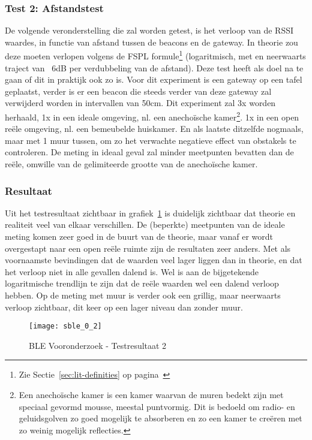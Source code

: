 \subsubsection{Test 2: Afstandstest}
\label{sec:ond-ble-0-2}
De volgende veronderstelling die zal worden getest, is het verloop van de RSSI waardes, in functie van afstand tussen de beacons en de gateway. In theorie zou deze moeten verlopen volgens de FSPL formule\footnote{Zie Sectie~\ref{sec:lit-definities} op pagina~\pageref{sec:lit-definities}} (logaritmisch, met en neerwaarts traject van ~6dB per verdubbeling van de afstand). Deze test heeft als doel na te gaan of dit in praktijk ook zo is.
Voor dit experiment is een gateway op een tafel geplaatst, verder is er een beacon die steeds verder van deze gateway zal verwijderd worden in intervallen van 50cm. Dit experiment zal 3x worden herhaald, 1x in een ideale omgeving, nl. een anechoïsche kamer\footnote{Een anechoïsche kamer is een kamer waarvan de muren bedekt zijn met speciaal gevormd mousse, meestal puntvormig. Dit is bedoeld om radio- en geluidsgolven zo goed mogelijk te absorberen en zo een kamer te creëren met zo weinig mogelijk reflecties.}. 1x in een open reële omgeving, nl. een bemeubelde huiskamer. En als laatste ditzelfde nogmaals, maar met 1 muur tussen, om zo het verwachte negatieve effect van obstakels te controleren. De meting in ideaal geval zal minder meetpunten bevatten dan de reële, omwille van de gelimiteerde grootte van de anechoïsche kamer.

\subsubsection{Resultaat}
Uit het testresultaat zichtbaar in grafiek~\ref{fig:ond-ble-2-res} is duidelijk zichtbaar dat theorie en realiteit veel van elkaar verschillen. De (beperkte) meetpunten van de ideale meting komen zeer goed in de buurt van de theorie, maar vanaf er wordt overgestapt naar een open reële ruimte zijn de resultaten zeer anders. Met als voornaamste bevindingen dat de waarden veel lager liggen dan in theorie, en dat het verloop niet in alle gevallen dalend is. Wel is aan de bijgetekende logaritmische trendlijn te zijn dat de reële waarden wel een dalend verloop hebben. Op de meting met muur is verder ook een grillig, maar neerwaarts verloop zichtbaar, dit keer op een lager niveau dan zonder muur.

\begin{figure}[h]
	\texttt{[image: sble\_0\_2]}
	\caption{BLE Vooronderzoek - Testresultaat 2}
	\label{fig:ond-ble-2-res}
\end{figure}

